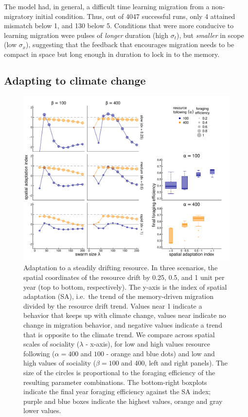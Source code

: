 \documentclass[12pt]{article}
\begin{document}
The model had, in general, a difficult time learning migration from a non-migratory initial condition. Thus, out of 4047 successful runs, only 4 attained mismatch below 1, and 130 below 5. Conditions that were more conducive to learning migration were pulses of \emph{longer} duration (high $\sigma_t$), but \emph{smaller} in scope (low $\sigma_x$), suggesting that the feedback that encourages migration needs to be compact in space but long enough in duration to lock in to the memory.

\subsection{Adapting to climate change}

\begin{figure}
\includegraphics[width = \textwidth]{figures/SpatialClimateChange.png}

\caption{\label{fig_adaptationclimate} Adaptation to a steadily drifting resource. In three scenarios, the spatial coordinates of the resource drift by 0.25, 0.5, and 1 unit per year (top to bottom, respectively). The y-axis is the index of spatial adaptation (SA), i.e.~the trend of the memory-driven migration divided by the resource drift trend. Values near 1 indicate a behavior that keeps up with climate change, values near indicate no change in migration behavior, and negative values indicate a trend that is opposite to the climate trend. We compare across spatial scales of sociality ($\lambda$ - x-axis), for low and high values resource following ($\alpha = 400$ and $100$ - orange and blue dots) and low and high values of sociality ($\beta = 100$ and 400, left and right panels). The size of the circles is proportional to the foraging efficiency of the resulting parameter combinations. The bottom-right boxplots indicate the final year foraging efficiency against the SA index; purple and blue boxes indicate the highest values, orange and gray lower values.}
\end{figure}
\end{document}
